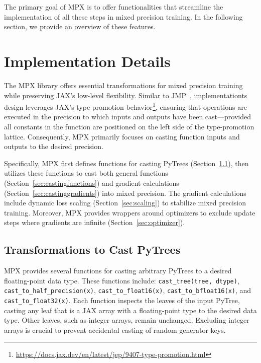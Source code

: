\documentclass[copyright, logo]{dsme}
\newcommand{\mpx}{\textsc{MPX}}
\begin{document}
The primary goal of \mpx{} is to offer functionalities that streamline the implementation of all these steps in mixed precision training. 
In the following section, we provide an overview of these features.

\section{Implementation Details}

The \mpx{} library offers essential transformations for mixed precision training while preserving JAX's low-level flexibility. 
Similar to JMP~\citep{jmp}, implementationts design leverages JAX's type-promotion behavior\footnote{\url{https://docs.jax.dev/en/latest/jep/9407-type-promotion.html}}, ensuring that operations are executed in the precision to which inputs and outputs have been cast—provided all constants in the function are positioned on the left side of the type-promotion lattice. 
Consequently, \mpx{} primarily focuses on casting function inputs and outputs to the desired precision.

Specifically, \mpx{} first defines functions for casting PyTrees (Section~\ref{sec:castingpytrees}), then utilizes these functions to cast both general functions (Section~\ref{sec:castingfunctions}) and gradient calculations (Section~\ref{sec:castinggradients}) into mixed precision. 
The gradient calculations include dynamic loss scaling (Section~\ref{sec:scaling}) to stabilize mixed precision training.
Moreover, \mpx{} provides wrappers around optimizers to exclude update steps where gradients are infinite (Section~\ref{sec:optimizer}).

\subsection{Transformations to Cast PyTrees}
\label{sec:castingpytrees}

\mpx{} provides several functions for casting arbitrary PyTrees to a desired floating-point data type. These functions include:
\texttt{cast\_tree(tree, dtype)}, \texttt{cast\_to\_half\_precision(x)}, \texttt{cast\_to\_float16(x)}, \texttt{cast\_to\_bfloat16(x)}, and \texttt{cast\_to\_float32(x)}. 
Each function inspects the leaves of the input PyTree, casting any leaf that is a JAX array with a floating-point type to the desired data type. 
Other leaves, such as integer arrays, remain unchanged. 
Excluding integer arrays is crucial to prevent accidental casting of random generator keys.
\end{document}

